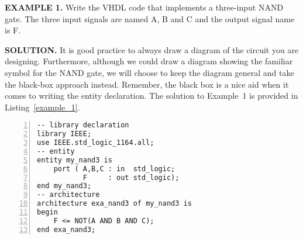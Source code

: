 \begin{leftbar}
\noindent
\textbf{EXAMPLE 1.}
Write the VHDL code that implements a three-input NAND gate. The three input signals are named A, B and C and the output signal name is F.
\end{leftbar}
\noindent
\textbf{SOLUTION.} It is good practice to always draw a diagram of the circuit you are designing. Furthermore, although we could draw a diagram showing the familiar symbol for the NAND gate, we will choose to keep the diagram general and take the black-box approach instead. Remember, the black box is a nice aid when it comes to writing the entity declaration. The solution to Example~1 is provided in Listing~\ref{example_1}.

\noindent
\begin{minipage}{0.55\linewidth}
\begin{lstlisting}[numbers=left,label=example_1, caption=Solution of Example~1.]
-- library declaration
library IEEE;
use IEEE.std_logic_1164.all;
-- entity
entity my_nand3 is
	port ( A,B,C : in  std_logic;
	       F     : out std_logic);
end my_nand3;
-- architecture
architecture exa_nand3 of my_nand3 is
begin
	F <= NOT(A AND B AND C);
end exa_nand3;
\end{lstlisting}
\end{minipage}
\begin{minipage}{0.4\linewidth}
\begin{flushright}
\end{flushright}
\end{minipage}

